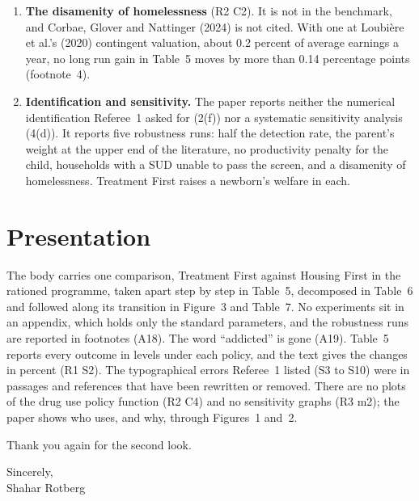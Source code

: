 \documentclass[11pt]{article}
\begin{document}
{\begin{enumerate}
\item \open \textbf{The disamenity of homelessness} (R2 C2). It is not in the benchmark, and
Corbae, Glover and Nattinger (2024) is not cited. With one at Loubi\`ere et al.'s (2020)
contingent valuation, about 0.2 percent of average earnings a year, no long run gain in Table~5
moves by more than 0.14 percentage points (footnote~4).

\item \open \textbf{Identification and sensitivity.} The paper reports neither the numerical
identification Referee~1 asked for (2(f)) nor a systematic sensitivity analysis (4(d)). It
reports five robustness runs: half the detection rate, the parent's weight at the upper end of
the literature, no productivity penalty for the child, households with a SUD unable to pass the
screen, and a disamenity of homelessness. Treatment First raises a newborn's welfare in each.
\end{enumerate}
}

\section*{\color{respred}Presentation}

{\color{respred}
The body carries one comparison, Treatment First against Housing First in the rationed
programme, taken apart step by step in Table~5, decomposed in Table~6 and followed along its
transition in Figure~3 and Table~7. No experiments sit in an appendix, which holds only the
standard parameters, and the robustness runs are reported in footnotes (A18). The word
``addicted'' is gone (A19). Table~5 reports every outcome in levels under each policy, and the
text gives the changes in percent (R1 S2). The typographical errors Referee~1 listed (S3 to S10)
were in passages and references that have been rewritten or removed. \open There are no plots of
the drug use policy function (R2 C4) and no sensitivity graphs (R3 m2); the paper shows who
uses, and why, through Figures~1 and~2.
}

\vspace{1em}
Thank you again for the second look.

\vspace{1.4em}
Sincerely,\\[0.6em]
Shahar Rotberg
\end{document}
